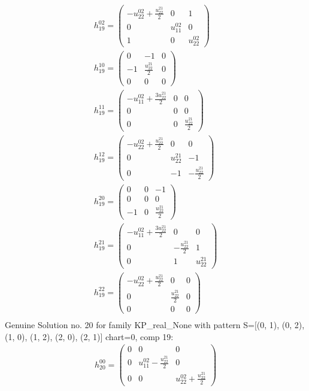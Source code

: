 \documentclass[a4paper, 11pt, twoside, onecolumn]{article}
\begin{document}
\begin{landscape}
\begin{gather*}
	 h_{19}^{02}=\begin{pmatrix}- u^{02}_{22} + \frac{u^{21}_{22}}{2} & 0 & 1\\0 & u^{02}_{11} & 0\\1 & 0 & u^{02}_{22}\end{pmatrix}\\ 
	 h_{19}^{10}=\begin{pmatrix}0 & -1 & 0\\-1 & \frac{u^{21}_{22}}{2} & 0\\0 & 0 & 0\end{pmatrix}\\ 
	 h_{19}^{11}=\begin{pmatrix}- u^{02}_{11} + \frac{3 u^{21}_{22}}{2} & 0 & 0\\0 & 0 & 0\\0 & 0 & \frac{u^{21}_{22}}{2}\end{pmatrix}\\ 
	 h_{19}^{12}=\begin{pmatrix}- u^{02}_{22} + \frac{u^{21}_{22}}{2} & 0 & 0\\0 & u^{21}_{22} & -1\\0 & -1 & - \frac{u^{21}_{22}}{2}\end{pmatrix}\\ 
	 h_{19}^{20}=\begin{pmatrix}0 & 0 & -1\\0 & 0 & 0\\-1 & 0 & \frac{u^{21}_{22}}{2}\end{pmatrix}\\ 
	 h_{19}^{21}=\begin{pmatrix}- u^{02}_{11} + \frac{3 u^{21}_{22}}{2} & 0 & 0\\0 & - \frac{u^{21}_{22}}{2} & 1\\0 & 1 & u^{21}_{22}\end{pmatrix}\\ 
	 h_{19}^{22}=\begin{pmatrix}- u^{02}_{22} + \frac{u^{21}_{22}}{2} & 0 & 0\\0 & \frac{u^{21}_{22}}{2} & 0\\0 & 0 & 0\end{pmatrix}\\ 
\end{gather*} 
Genuine Solution no. 20 for family KP_real_None with pattern S=[(0, 1), (0, 2), (1, 0), (1, 2), (2, 0), (2, 1)] chart=0, comp 19: 
\begin{gather*} 
	 h_{20}^{00}=\begin{pmatrix}0 & 0 & 0\\0 & u^{02}_{11} - \frac{u^{21}_{22}}{2} & 0\\0 & 0 & u^{02}_{22} + \frac{u^{21}_{22}}{2}\end{pmatrix}\\ 

\end{gather*}
\end{landscape}
\end{document}
